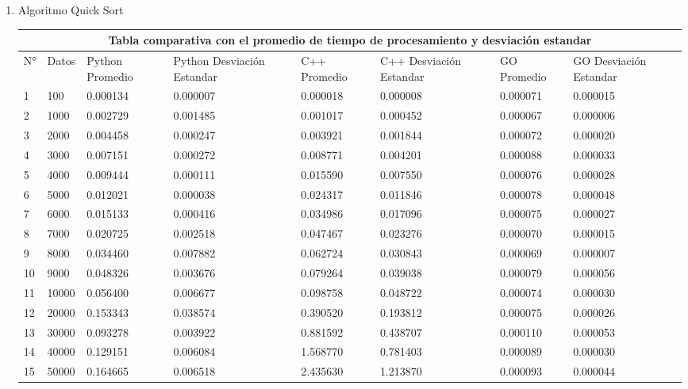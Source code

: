 \documentclass{article}
\begin{document}
\begin{enumerate}
        \item Algoritmo Quick Sort
        
\begin{tabular}{ |p{0.3cm}||p{0.9cm}|p{1.5cm}|p{1.7cm}|p{1.5cm}|p{1.7cm}|p{1.8cm}|p{1.7cm}|  }
 \hline
 \multicolumn{8}{|c|}{Tabla comparativa con el promedio de tiempo de procesamiento y desviación estandar} \\
 \hline
 N°& Datos &Python Promedio &Python Desviación Estandar &C++ Promedio &C++ Desviación Estandar &GO Promedio &GO Desviación Estandar\\
 \hline
 1&100 &0.000134 &0.000007 &0.000018 &0.000008 &0.000071 &0.000015\\
 2&1000 &0.002729 &0.001485 &0.001017 &0.000452 &0.000067 &0.000006\\
 3&2000 &0.004458 &0.000247 &0.003921 &0.001844 &0.000072 &0.000020\\
 4&3000 &0.007151 &0.000272 &0.008771 &0.004201 &0.000088 &0.000033\\
 5&4000 &0.009444 &0.000111 &0.015590 &0.007550 &0.000076 &0.000028\\
 6&5000 &0.012021 &0.000038 &0.024317 &0.011846 &0.000078 &0.000048\\
 7&6000 &0.015133 &0.000416 &0.034986 &0.017096 &0.000075 &0.000027\\
 8&7000 &0.020725 &0.002518 &0.047467 &0.023276 &0.000070 &0.000015\\
 9&8000 &0.034460 &0.007882 &0.062724 &0.030843 &0.000069 &0.000007\\
 10&9000 &0.048326 &0.003676 &0.079264 &0.039038 &0.000079 &0.000056\\
 11&10000 &0.056400 &0.006677 &0.098758 &0.048722 &0.000074 &0.000030\\
 12&20000 &0.153343 &0.038574 &0.390520 &0.193812 &0.000075 &0.000026\\
 13&30000 &0.093278 &0.003922 &0.881592 &0.438707 &0.000110 &0.000053\\
 14&40000 &0.129151 &0.006084 &1.568770 &0.781403 &0.000089 &0.000030\\
 15&50000 &0.164665 &0.006518 &2.435630 &1.213870 &0.000093 &0.000044\\
 \hline
\end{tabular}


\end{enumerate}
\end{document}
